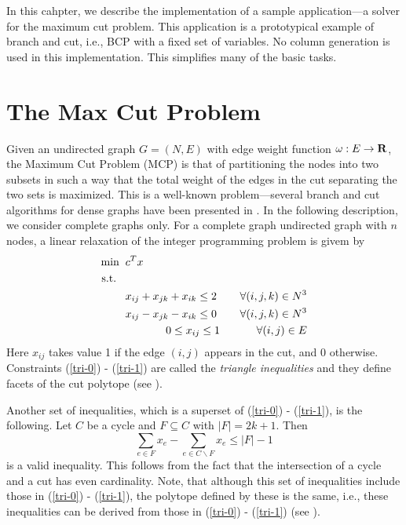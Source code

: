 In this cahpter, we describe the implementation of a sample
application---a solver for the maximum cut problem. This application
is a prototypical example of branch and cut, i.e., BCP with a fixed
set of variables. No column generation is used in this implementation.
This simplifies many of the basic tasks.


\section{The Max Cut Problem}
\label{MCP}

Given an undirected graph $G=(N,E)$ with edge weight function $\omega:
E \rightarrow {\rm \bf R}$, the Maximum Cut Problem (MCP) is that of
partitioning the nodes into two subsets in such a way that the total
weight of the edges in the cut separating the two sets is maximized.
This is a well-known problem---several branch and cut algorithms for
dense graphs have been presented in 
\cite{A:barahona-junger-reinelt,A:desimone-rinaldi}. In the following
description, we consider complete graphs only. For a complete graph
undirected graph with $n$ nodes, a linear relaxation of the integer
programming problem is givem by
\begin{eqnarray}
\min \;\; & c^Tx & \nonumber \\
{\rm s.t.} \;\;\; && \nonumber \\
& x_{ij}+x_{jk}+x_{ik} \le  2 & \;\;\;\forall (i,j,k) \in N^3 
\label{tri-0} \\
& x_{ij}-x_{jk}-x_{ik} \le  0 & \;\;\;\forall (i,j,k) \in N^3 
\label{tri-1} \\
& \hskip .51in 0 \le x_{ij} \le 1 & \;\;\;\forall (i,j) \in E \\
\end{eqnarray}
Here $x_{ij}$ takes value 1 if the edge $(i,j)$ appears in the cut, and 0
otherwise. Constraints (\ref{tri-0}) - (\ref{tri-1}) are called the
{\it triangle inequalities} and they define facets of the cut polytope
(see \cite{A:barahona-mahjoub:cut-polytope}).

Another set of inequalities, which is a superset of (\ref{tri-0}) -
(\ref{tri-1}), is the following. Let $C$ be a cycle and $F \subseteq
C$ with $|F|=2k+1$. Then
\begin{equation}
\sum_{e \in F} x_e - \sum_{e \in C\backslash F} x_e \le |F|-1 \label{c}
\end{equation}
is a valid inequality. This follows from the fact that the
intersection of a cycle and a cut has even cardinality. Note, that
although this set of inequalities include those in (\ref{tri-0}) -
(\ref{tri-1}), the polytope defined by these is the same, i.e., these
inequalities can be derived from those in (\ref{tri-0}) -
(\ref{tri-1}) (see \cite{A:barahona-mahjoub:cut-polytope}).


